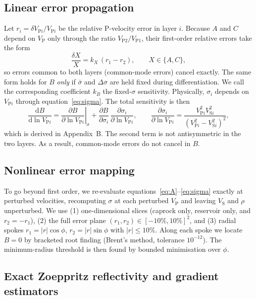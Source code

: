\documentclass[11pt]{article}
\newcommand{\VP}{V_\mathrm{P}}
\newcommand{\VS}{V_\mathrm{S}}
\begin{document}
\subsection*{Linear error propagation}

Let $r_i=\delta V_{\mathrm{P}i}/V_{\mathrm{P}i}$ be the relative P-velocity error in layer $i$. Because $A$ and $C$ depend on $\VP$ only through the ratio $V_{\mathrm{P}2}/V_{\mathrm{P}1}$, their first-order relative errors take the form
\begin{equation}
\frac{\delta X}{X}=k_X\,(r_1-r_2),\qquad X\in\{A,C\},
\label{eq:kX}
\end{equation}
so errors common to both layers (common-mode errors) cancel exactly. The same form holds for $B$ \emph{only} if $\bar\sigma$ and $\Delta\sigma$ are held fixed during differentiation. We call the corresponding coefficient $k_B$ the fixed-$\sigma$ sensitivity. Physically, $\sigma_i$ depends on $V_{\mathrm{P}i}$ through equation~\ref{eq:sigma}. The total sensitivity is then
\begin{equation}
\frac{\mathrm{d}B}{\mathrm{d}\ln V_{\mathrm{P}i}}=\left.\frac{\partial B}{\partial\ln V_{\mathrm{P}i}}\right|_{\sigma}+\frac{\partial B}{\partial\sigma_i}\,\frac{\partial\sigma_i}{\partial\ln V_{\mathrm{P}i}},\qquad
\frac{\partial\sigma_i}{\partial\ln V_{\mathrm{P}i}}=\frac{V_{\mathrm{P}i}^2V_{\mathrm{S}i}^2}{\left(V_{\mathrm{P}i}^2-V_{\mathrm{S}i}^2\right)^2},
\label{eq:total}
\end{equation}
which is derived in Appendix~B. The second term is not antisymmetric in the two layers. As a result, common-mode errors do not cancel in $B$.

\subsection*{Nonlinear error mapping}

To go beyond first order, we re-evaluate equations~\ref{eq:A}--\ref{eq:sigma} exactly at perturbed velocities, recomputing $\sigma$ at each perturbed $\VP$ and leaving $\VS$ and $\rho$ unperturbed. We use (1) one-dimensional slices (caprock only, reservoir only, and $r_2=-r_1$), (2) the full error plane $(r_1,r_2)\in[-10\%,10\%]^2$, and (3) radial spokes $r_1=|r|\cos\phi$, $r_2=|r|\sin\phi$ with $|r|\le10\%$. Along each spoke we locate $B=0$ by bracketed root finding (Brent's method, tolerance $10^{-12}$). The minimum-radius threshold is then found by bounded minimisation over $\phi$.

\subsection*{Exact Zoeppritz reflectivity and gradient estimators}
\end{document}
